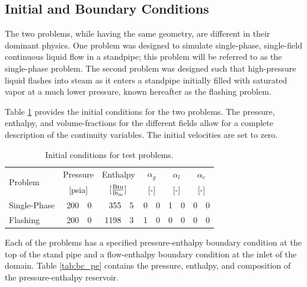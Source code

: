 \subsection{Initial and Boundary Conditions}
\label{subsect:ic_bc}

The two problems, while having the same geometry, are different in their dominant physics.
One problem was designed to simulate single-phase, single-field continuous liquid flow in a standpipe; this problem will be referred to as the single-phase problem.
The second problem was designed such that high-pressure liquid flashes into steam as it enters a standpipe initially filled with saturated vapor at a much lower pressure, known hereafter as the flashing problem.

Table \ref{tab:ic} provides the initial conditions for the two problems.
The pressure, enthalpy, and volume-fractions for the different fields allow for a complete description of the continuity variables.
The initial velocities are set to zero.

\begin{table}[ht]
\centering
\begin{tabular}{@{}lr@{.}lr@{.}lr@{.}lr@{.}lr@{.}l@{}} \toprule
\multirow{2}{*}{Problem} & \multicolumn{2}{c}{Pressure} & \multicolumn{2}{c}{Enthalpy}             & \multicolumn{2}{c}{$\alpha_g$} & \multicolumn{2}{c}{$\alpha_l$} & \multicolumn{2}{c}{$\alpha_e$} \\ 
                         & \multicolumn{2}{c}{[psia]} & \multicolumn{2}{c}{$[\frac{\text{Btu}}{\lbm{}}]$} & \multicolumn{2}{c}{[-]}      & \multicolumn{2}{c}{[-]}      & \multicolumn{2}{c}{[-]}      \\ \midrule
Single-Phase             &  200&0                       &  355&5                                   & 0&0                            & 1&0                            & 0&0 \\
Flashing                 &  200&0                       & 1198&3                                   & 1&0                            & 0&0                            & 0&0 \\ \bottomrule  
\end{tabular}
\caption{Initial conditions for test problems.}
\label{tab:ic}
\end{table}

Each of the problems has a specified pressure-enthalpy boundary condition at the top of the stand pipe and a flow-enthalpy boundary condition at the inlet of the domain.
Table \ref{tab:bc_pe} contains the pressure, enthalpy, and composition of the pressure-enthalpy reservoir. 

